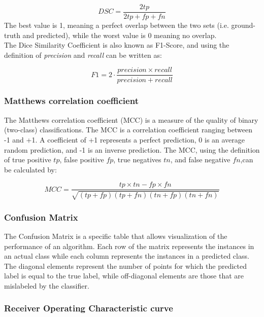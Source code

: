 \documentclass{standalone}
\begin{document}
\begin{equation*}
    DSC = \frac{2 tp}{2tp + fp + fn}
\end{equation*}
The best value is 1, meaning a perfect overlap between the two sets (i.e. ground-truth and predicted), while the worst value is 0 meaning no overlap.
\\
The Dice Similarity Coefficient is also known as F1-Score, and using the definition of \textit{precision} and \textit{recall} can be written as:

\begin{equation*}
    F1 = 2 \cdot \frac{precision \times recall}{precision + recall}
\end{equation*}


\subsubsection{Matthews correlation coefficient}
The Matthews correlation coefficient (MCC) is a measure of the quality of binary (two-class) classifications.
The MCC is a correlation coefficient ranging between -1 and +1. 
A coefficient of +1 represents a perfect prediction, 0 is an average random prediction, and -1 is an inverse prediction.
The MCC, using the definition of true positive $tp$, false positive $fp$, true negatives $tn$, and false negative $fn$,can be calculated by:

\begin{equation*}
    MCC = \frac{tp \times tn - fp \times fn}{ \sqrt{(tp + fp)(tp + fn)(tn + fp)(tn + fn)}}
\end{equation*}


\subsubsection{Confusion Matrix}

The Confusion Matrix is a specific table that allows visualization of the performance of an algorithm.
Each row of the matrix represents the instances in an actual class while each column represents the instances in a predicted class.
The diagonal elements represent the number of points for which the predicted label is equal to the true label, while off-diagonal elements are those that are mislabeled by the classifier. 

\subsubsection{Receiver Operating Characteristic curve}
\end{document}
